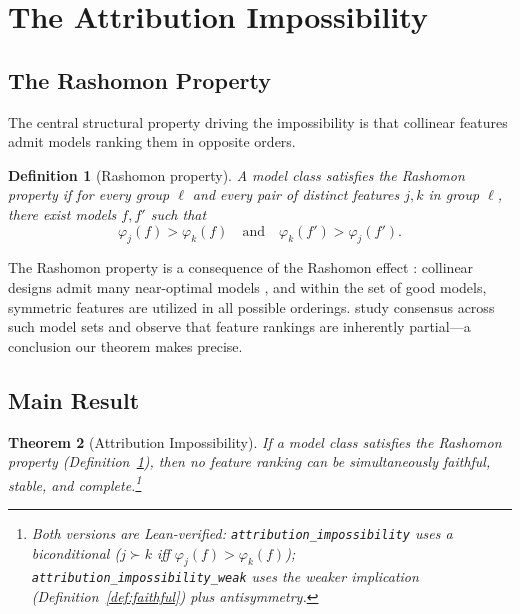 \documentclass{article}
\newtheorem{theorem}{Theorem}
\newtheorem{definition}[theorem]{Definition}
\begin{document}

\section{The Attribution Impossibility}
\label{sec:impossibility}

\subsection{The Rashomon Property}
\label{sec:rashomon}

The central structural property driving the impossibility is that collinear features admit models ranking them in opposite orders.

\begin{definition}[Rashomon property]
\label{def:rashomon}
A model class satisfies the \emph{Rashomon property} if for every group $\ell$ and every pair of distinct features $j, k$ in group $\ell$, there exist models $f, f'$ such that
\[
    \varphi_j(f) > \varphi_k(f) \quad \text{and} \quad \varphi_k(f') > \varphi_j(f').
\]
\end{definition}

\begin{sloppypar}
The Rashomon property is a consequence of the Rashomon effect
\citep{rudin2024amazing,fisher2019models}: collinear designs admit many near-optimal
models \citep{damour2022underspecification}, and within the set of good models,
symmetric features are utilized in all possible orderings.
\citet{laberge2023partial} study consensus across such model sets and observe that
feature rankings are inherently partial---a conclusion our theorem makes precise.
\end{sloppypar}

\subsection{Main Result}
\label{sec:main-result}

\begin{theorem}[Attribution Impossibility]
\label{thm:impossibility}
If a model class satisfies the Rashomon property (Definition~\ref{def:rashomon}),
then no feature ranking can be simultaneously faithful, stable, and
complete.\footnote{Both versions are Lean-verified:
\texttt{attribution\allowbreak\_impossibility} uses a biconditional
($j \succ k$ iff $\varphi_j(f) > \varphi_k(f)$);
\texttt{attribution\allowbreak\_impossibility\allowbreak\_weak} uses the weaker
implication (Definition~\ref{def:faithful}) plus antisymmetry.}
\end{theorem}
\end{document}
